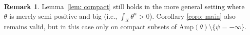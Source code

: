\documentclass[a4paper,11pt]{amsart}
\numberwithin{equation}{section}
\theoremstyle{definition}
\newtheorem{remark}[theorem]{Remark}
\begin{document}
\begin{remark}
     Lemma~\ref{lem: compact} still holds in the more general setting where $\theta$ is merely semi-positive and big (i.e., $\int_X \theta^n > 0$). Corollary \ref{coro: main} also remains valid, but in this case only on compact subsets of $\textrm{Amp}(\theta) \setminus \{\psi = -\infty\}$.
\end{remark}

		
\end{document}
